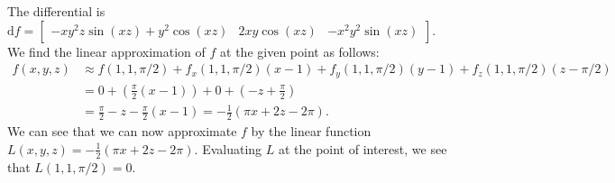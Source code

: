 \documentclass[12pt]{book}
\newenvironment{exercise}[2][Exercise]{\begin{trivlist}
\item[\hskip \labelsep {\bfseries #1}\hskip \labelsep {\bfseries #2.}]}{\end{trivlist}}
\begin{document}
\begin{exercise}{9.2.5}
	The differential is $\text{d} f = \left[\begin{matrix}- x y^{2} z \sin{\left (x z \right )} + y^{2} \cos{\left (x z \right )} & 2 x y \cos{\left (x z \right )} & - x^{2} y^{2} \sin{\left (x z \right )}\end{matrix}\right]$. \\
    We find the linear approximation of $f$ at the given point as follows:
    \begin{align*}
    f(x,y,z) &\approx f(1,1,\pi/2) + f_x(1,1,\pi/2) (x-1) + f_y(1,1,\pi/2) (y-1) + f_z(1,1,\pi/2) (z-\pi/2) \\
     &= 0 + \left( \frac{\pi}{2} \left(x - 1\right) \right) + 0 + \left( - z + \frac{\pi}{2} \right) \\
     &= \frac{\pi}{2} - z - \frac{\pi}{2} \left(x - 1\right) = - \frac{1}{2} \left(\pi x + 2 z - 2 \pi\right).
    \end{align*}
    We can see that we can now approximate $f$ by the linear function $L(x,y,z) =- \frac{1}{2} \left(\pi x + 2 z - 2 \pi\right)$. Evaluating $L$ at the point of interest, we see that $L(1,1,\pi/2)=0$.
\end{exercise}
\end{document}
